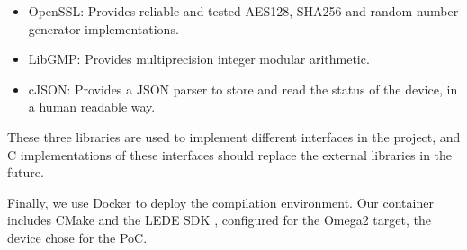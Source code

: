 \begin{itemize}
	\item OpenSSL: Provides reliable and tested AES128, SHA256 and random number generator implementations.
	\item LibGMP: Provides multiprecision integer modular arithmetic.
	\item cJSON: Provides a JSON parser to store and read the status of the device, in a human readable way.
\end{itemize}

These three libraries are used to implement different interfaces in the project, and C implementations of these interfaces should replace the external libraries in the future.

\hfil

Finally, we use Docker to deploy the compilation environment. Our container includes CMake and the LEDE SDK \citep{ledeproject}, configured for the Omega2 target, the device chose for the PoC.



